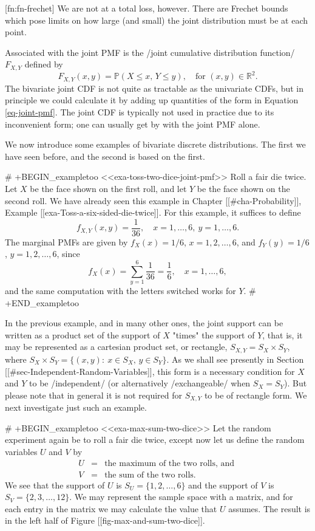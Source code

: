 [fn:fn-frechet] We are not at a total loss, however. There are Frechet
bounds which pose limits on how large (and small) the joint
distribution must be at each point.

Associated with the joint PMF is the /joint cumulative distribution
function/ \(F_{X,Y}\) defined by \[ F_{X,Y}(x,y)=\mathbb{P}(X\leq x,\,
Y\leq y),\quad \mbox{for }(x,y)\in\mathbb{R}^{2}.  \] The bivariate
joint CDF is not quite as tractable as the univariate CDFs, but in
principle we could calculate it by adding up quantities of the form in
Equation \eqref{eq-joint-pmf}. The joint CDF is typically not used in practice due to
its inconvenient form; one can usually get by with the joint PMF
alone.

We now introduce some examples of bivariate discrete
distributions. The first we have seen before, and the second is based
on the first.

# +BEGIN_exampletoo
<<exa-toss-two-dice-joint-pmf>> Roll a fair die twice. Let \(X\) be
the face shown on the first roll, and let \(Y\) be the face shown on
the second roll. We have already seen this example in Chapter
[[#cha-Probability]], Example [[exa-Toss-a-six-sided-die-twice]]. For this
example, it suffices to define \[ f_{X,Y}(x,y)=\frac{1}{36},\quad
x=1,\ldots,6,\ y=1,\ldots,6.  \] The marginal PMFs are given by
\(f_{X}(x)=1/6\), \(x=1,2,\ldots,6\), and \(f_{Y}(y)=1/6\),
\(y=1,2,\ldots,6\), since \[
f_{X}(x)=\sum_{y=1}^{6}\frac{1}{36}=\frac{1}{6},\quad x=1,\ldots,6, \]
and the same computation with the letters switched works for \(Y\).
# +END_exampletoo

In the previous example, and in many other ones, the joint support can
be written as a product set of the support of \(X\) "times" the
support of \(Y\), that is, it may be represented as a cartesian
product set, or rectangle, \(S_{X,Y}=S_{X}\times S_{Y}\), where
\(S_{X} \times S_{Y}= \{ (x,y):\ x\in S_{X},\, y\in S_{Y} \} \). As we
shall see presently in Section [[#sec-Independent-Random-Variables]], this form
is a necessary condition for \(X\) and \(Y\) to be /independent/ (or
alternatively /exchangeable/ when \(S_{X}=S_{Y}\)). But please note
that in general it is not required for \(S_{X,Y}\) to be of rectangle
form. We next investigate just such an example.


# +BEGIN_exampletoo
<<exa-max-sum-two-dice>> Let the random experiment again be to roll a
fair die twice, except now let us define the random variables \(U\)
and \(V\) by
\begin{eqnarray*}
U & = & \mbox{the maximum of the two rolls, and }\\
V & = & \mbox{the sum of the two rolls.}
\end{eqnarray*}
We see that the support of \(U\) is \(S_{U}= \{ 1,2,\ldots,6 \} \) and
the support of \(V\) is \(S_{V}= \{ 2,3,\ldots,12 \} \). We may
represent the sample space with a matrix, and for each entry in the
matrix we may calculate the value that \(U\) assumes. The result is in
the left half of Figure [[fig-max-and-sum-two-dice]].

